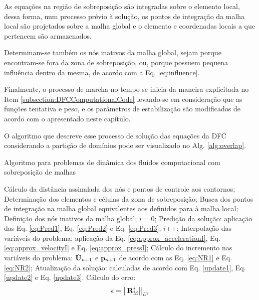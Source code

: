 \documentclass[tese_patricia]{subfiles}
\begin{document}
As equações na região de sobreposição são integradas sobre o elemento local, dessa forma, num processo prévio à solução, os pontos de integração da malha local são projetados sobre a malha global e o elemento e coordenadas locais a que pertencem são armazenados. 

Determinam-se também os nós inativos da malha global, sejam porque encontram-se fora da zona de sobreposição, ou, porque possuem pequena influência dentro da mesma, de acordo com a Eq. \ref{eq:influence}.

Finalmente, o processo de marcha no tempo se inicia da maneira explicitada no Item \ref{subsection:DFCComputationalCode} levando-se em consideração que as funções tentativa e peso, e os parâmetros de estabilização são modificados de acordo com o apresentado neste capítulo.

O algoritmo que descreve esse processo de solução das equações da DFC considerando a partição de domínios pode ser visualizado no Alg. \ref{alg:overlap}.


\begin{algorithm}
	\caption{Algoritmo para problemas de dinâmica dos fluidos computacional com sobreposição de malhas}
	\label{alg:overlap}
	\begin{algorithmic}[1]
		\State Cálculo da distância assinalada dos nós e pontos de controle aos contornos;
		\State Determinação dos elementos e células da zona de sobreposição;
		\State Busca dos pontos de integração na malha global equivalentes aos definidos para à malha local;
		\State Definição dos nós inativos da malha global;
		\State $i=0$;
		\State Predição da solução: aplicação das Eq. \eqref{eq:Pred1}, Eq. \eqref{eq:Pred2} e Eq. \eqref{eq:Pred3};
		\State $i$++;
		\State Interpolação das variáveis do problema: aplicação da Eq. \eqref{eq:approx_accelerationI}, Eq. \eqref {eq:approx_velocityI} e Eq. \eqref{eq:approx_pressI};
		\State Cálculo do incremento nas variáveis do problema: $\dot{\mathbf{U}}_{n+1}$ e $\mathbf{p}_{n+1}$ de acordo com as Eq. \eqref{eq:NR1} e Eq. \eqref{eq:NR2};
		\State Atualização da solução: calculadas de acordo com Eq. \eqref{update1}, Eq. \eqref{update2} e Eq. \eqref{update3}.
		\State Cálculo do erro:
		\begin{align}
		\epsilon =\left\| \mathbf{R}_\mathrm{M}^i \right\|_{L^2}
		\end{align}
		\EndWhile
		\EndFor
	\end{algorithmic}
\end{algorithm}
\end{document}
